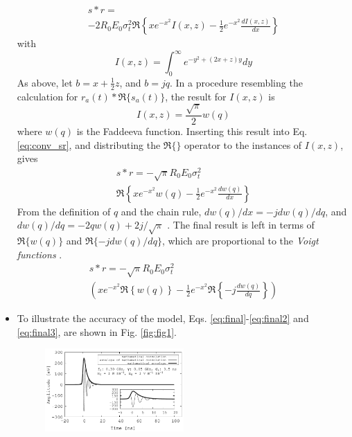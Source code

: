 \documentclass[amsmath,amssymb,aps,prd,10pt,twocolumn,showkeys]{revtex4}
\begin{document}
\begin{itemize}
\begin{multline}
s * r = \\ -2R_0 E_0 \sigma_t^2 \Re\left\lbrace xe^{-x^2}I(x,z) - \frac{1}{2}e^{-x^2} \frac{dI(x,z)}{dx} \right\rbrace \label{eq:conv_sr}
\end{multline}
with
\begin{equation}
I(x,z) = \int_0^{\infty} e^{-y^2 + (2x + z)y}dy
\end{equation}
As above, let $b=x+\frac{1}{2}z$, and $b = j q$.  In a procedure resembling the calculation for $r_a(t) * \Re\lbrace s_a(t)\rbrace$, the result for $I(x,z)$ is
\begin{equation}
I(x,z) = \frac{\sqrt{\pi}}{2} w(q)
\end{equation}
where $w(q)$ is the Faddeeva function.  Inserting this result into Eq. \ref{eq:conv_sr}, and distributing the $\Re\lbrace \rbrace$ operator to the instances of $I(x,z)$, gives
\begin{multline}
s * r = -\sqrt{\pi}R_0 E_0 \sigma_t^2 \\ \Re\left\lbrace xe^{-x^2} w(q) - \frac{1}{2}e^{-x^2} \frac{d w(q)}{dx} \right\rbrace
\end{multline}
From the definition of $q$ and the chain rule, $dw(q)/dx = -jdw(q)/dq$, and $dw(q)/dq = -2qw(q)+2j/\sqrt{\pi}$ \cite{NIST:DLMF}.  The final result is left in terms of $\Re\lbrace w(q)\rbrace$ and $\Re\lbrace -jdw(q)/dq\rbrace$, which are proportional to the \textit{Voigt functions} \cite{NIST:DLMF,PhysRevD.105.123019}.
\begin{multline}
s * r = -\sqrt{\pi}R_0 E_0 \sigma_t^2 \\ \left(xe^{-x^2} \Re\left\lbrace w(q) \right\rbrace - \frac{1}{2}e^{-x^2} \Re\left\lbrace -j \frac{d w(q)}{dq} \right\rbrace \right) \label{eq:final3}
\end{multline}
\item To illustrate the accuracy of the model, Eqs. \ref{eq:final}-\ref{eq:final2} and \ref{eq:final3}, are shown in Fig. \ref{fig:fig1}.
\begin{figure}[ht]
\centering
\includegraphics[width=0.5\textwidth]{July3rd_plot1.pdf}

\end{figure}
\end{itemize}
\end{document}
